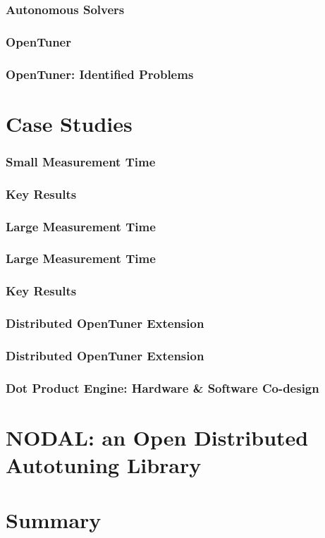 \documentclass[10pt, compress, aspectratio=169]{beamer}
\begin{document}
\begin{frame}
    \frametitle{Autonomous Solvers}
\end{frame}

\begin{frame}
    \frametitle{OpenTuner}
\end{frame}

\begin{frame}
    \frametitle{OpenTuner: Identified Problems}
\end{frame}

\section{Case Studies}

\begin{frame}
    \frametitle{Small Measurement Time}
\end{frame}

\begin{frame}
    \frametitle{Key Results}
\end{frame}

\begin{frame}
    \frametitle{Large Measurement Time}
\end{frame}

\begin{frame}
    \frametitle{Large Measurement Time}
\end{frame}

\begin{frame}
    \frametitle{Key Results}
\end{frame}

\begin{frame}
    \frametitle{Distributed OpenTuner Extension}
\end{frame}

\begin{frame}
    \frametitle{Distributed OpenTuner Extension}
\end{frame}

\begin{frame}
    \frametitle{Dot Product Engine: Hardware \& Software Co-design}
\end{frame}

\section{NODAL: an Open Distributed Autotuning Library}

\begin{frame}
    \frametitle{}
\end{frame}

\section{Summary}

\begin{frame}
    \frametitle{}
\end{frame}

\maketitle
\end{document}
